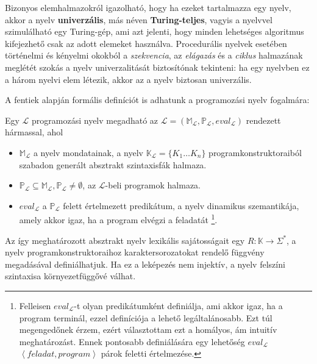 Bizonyos elemhalmazokról igazolható, hogy ha ezeket tartalmazza egy nyelv, akkor a nyelv \textbf{univerzális}, más néven \textbf{Turing-teljes}, vagyis a nyelvvel szimulálható egy Turing-gép, ami azt jelenti, hogy minden lehetséges algoritmus kifejezhető csak az adott elemeket használva.
Procedurális nyelvek esetében történelmi és kényelmi okokból a \textit{szekvencia}, az \textit{elágazás} és a \textit{ciklus} halmazának meglétét szokás a nyelv univerzalitását biztosítónak tekinteni: ha egy nyelvben ez a három nyelvi elem létezik, akkor az a nyelv biztosan univerzális\cite{Fothi}.

\bigskip

\noindent A fentiek alapján formális definíciót is adhatunk a programozási nyelv fogalmára:
\begin{defn}
	Egy $\mathcal{L}$ programozási nyelv megadható az $\mathcal{L} = (
		\mathbb{M}_\mathcal{L},
		\mathbb{P}_\mathcal{L},
		eval_\mathcal{L}
	)$ rendezett hármassal, ahol
	\begin{itemize}
		\item $\mathbb{M}_\mathcal{L}$ a nyelv mondatainak, a nyelv $\mathbb{K}_\mathcal{L} = \{K_1 \ldots K_n\}$ programkonstruktoraiból szabadon generált absztrakt szintaxisfák halmaza.
		\item $\mathbb{P}_\mathcal{L} \subseteq \mathbb{M}_\mathcal{L}, \mathbb{P}_\mathcal{L} \not= \emptyset$, az $\mathcal{L}$-beli programok halmaza.
		\item $eval_{\mathcal{L}}$ a $\mathbb{P}_\mathcal{L}$ felett értelmezett predikátum, a nyelv dinamikus szemantikája, amely akkor igaz, ha a program elvégzi a feladatát%
		\footnote{
			Felleisen $eval_\mathcal{L}$-t olyan predikátumként definiálja, ami akkor igaz, ha a program terminál\cite{Felleisen90}, ezzel  definíciója a lehető legáltalánosabb. Ezt túl megengedőnek érzem, ezért választottam ezt a homályos, ám intuitív meghatározást. Ennek pontosabb definiálására egy lehetőség $eval_\mathcal{L}$ $\left<feladat, program\right>$ párok feletti értelmezése.
		}.
	\end{itemize}

	\normalfont Az így meghatározott absztrakt nyelv lexikális sajátosságait egy $R: \mathbb{K} \rightarrow \Sigma^*$, a nyelv programkonstruktoraihoz karaktersorozatokat rendelő függvény megadásával definiálhatjuk. Ha ez a leképezés nem injektív, a nyelv felszíni szintaxisa környezetfüggővé válhat.
\end{defn}

